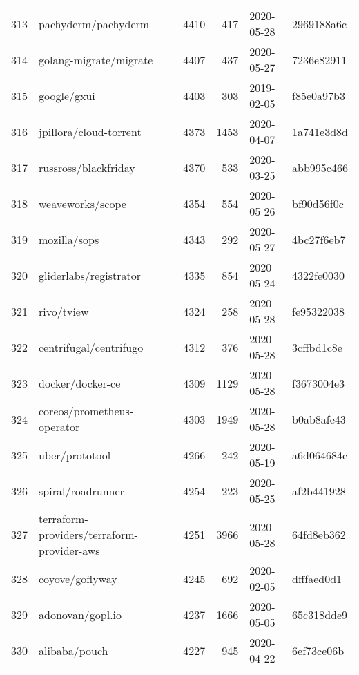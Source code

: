 \begin{longtable}{llrrll}
    313 &                                pachyderm/pachyderm &   4410 &    417 & 2020-05-28 &  2969188a6c \\
    314 &                             golang-migrate/migrate &   4407 &    437 & 2020-05-27 &  7236e82911 \\
    315 &                                        google/gxui &   4403 &    303 & 2019-02-05 &  f85e0a97b3 \\
    316 &                             jpillora/cloud-torrent &   4373 &   1453 & 2020-04-07 &  1a741e3d8d \\
    317 &                               russross/blackfriday &   4370 &    533 & 2020-03-25 &  abb995c466 \\
    318 &                                   weaveworks/scope &   4354 &    554 & 2020-05-26 &  bf90d56f0c \\
    319 &                                       mozilla/sops &   4343 &    292 & 2020-05-27 &  4bc27f6eb7 \\
    320 &                             gliderlabs/registrator &   4335 &    854 & 2020-05-24 &  4322fe0030 \\
    321 &                                         rivo/tview &   4324 &    258 & 2020-05-28 &  fe95322038 \\
    322 &                             centrifugal/centrifugo &   4312 &    376 & 2020-05-28 &  3cffbd1c8e \\
    323 &                                   docker/docker-ce &   4309 &   1129 & 2020-05-28 &  f3673004e3 \\
    324 &                         coreos/prometheus-operator &   4303 &   1949 & 2020-05-28 &  b0ab8afe43 \\
    325 &                                     uber/prototool &   4266 &    242 & 2020-05-19 &  a6d064684c \\
    326 &                                  spiral/roadrunner &   4254 &    223 & 2020-05-25 &  af2b441928 \\
    327 &         terraform-providers/terraform-provider-aws &   4251 &   3966 & 2020-05-28 &  64fd8eb362 \\
    328 &                                    coyove/goflyway &   4245 &    692 & 2020-02-05 &  dfffaed0d1 \\
    329 &                                   adonovan/gopl.io &   4237 &   1666 & 2020-05-05 &  65c318dde9 \\
    330 &                                      alibaba/pouch &   4227 &    945 & 2020-04-22 &  6ef73ce06b \\

\end{longtable}
